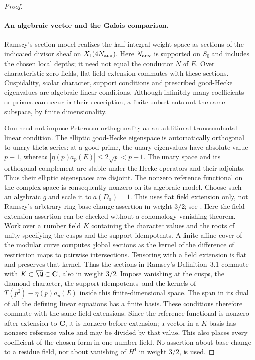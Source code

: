 \begin{proof}
\paragraph{An algebraic vector and the Galois comparison.}
Ramsey's section model \cite[Definition~3.1 and Theorem~4.2]{ramsey} realizes the half-integral-weight space as
sections of the indicated divisor sheaf on $X_1(4N_{\rm aux})$.
Here $N_{\rm aux}$ is supported on $S_0$ and includes the chosen
local depths; it need not equal the conductor $N$ of $E$.
Over characteristic-zero fields, flat field extension commutes
with these sections. Cuspidality, scalar character, support
conditions and prescribed good-Hecke eigenvalues are algebraic
linear conditions. Although infinitely many coefficients or
primes can occur in their description, a finite subset cuts out
the same subspace, by finite dimensionality.

One need not impose Petersson orthogonality as an additional
transcendental linear condition. The elliptic good-Hecke eigenspace
is automatically orthogonal to unary theta series: at a good prime,
the unary eigenvalues have absolute value $p+1$, whereas
$|\eta(p)a_p(E)|\le2\sqrt p<p+1$. The unary space and its
orthogonal complement are stable under the Hecke operators and
their adjoints. Thus their elliptic eigenspaces are disjoint.
The nonzero reference functional on the complex space is consequently
nonzero on its algebraic model. Choose such an algebraic $g$ and
scale it to $a(D_0)=1$.
This uses flat field extension only, not Ramsey's arbitrary-ring
base-change assertion in weight $3/2$; see \cite[Remark~4.4]{ramsey}.
Here the field-extension assertion can be checked without a
cohomology-vanishing theorem. Work over a number field $K$ containing
the character values and the roots of unity specifying the cusps and
the support idempotents. A finite affine cover of the modular curve
computes global sections as the kernel of the difference of restriction
maps to pairwise intersections. Tensoring with a field extension is
flat and preserves that kernel. Thus the sections in Ramsey's
Definition~3.1 commute with $K\subset\overline\Q\subset\mathbf C$,
also in weight $3/2$. Impose vanishing at the cusps, the diamond
character, the support idempotents, and the kernels of
$T(p^2)-\eta(p)a_p(E)$ inside this finite-dimensional space.
The span in its dual of all the defining linear equations has a finite
basis. These conditions therefore commute with the same field
extensions. Since the reference functional is nonzero after extension
to $\mathbf C$, it is nonzero before extension; a vector in a $K$-basis has
nonzero reference value and may be divided by that value.
This also places every coefficient of the chosen form in one number
field. No assertion about base change to a residue field, nor about
vanishing of $H^1$ in weight $3/2$, is used.



\end{proof}
